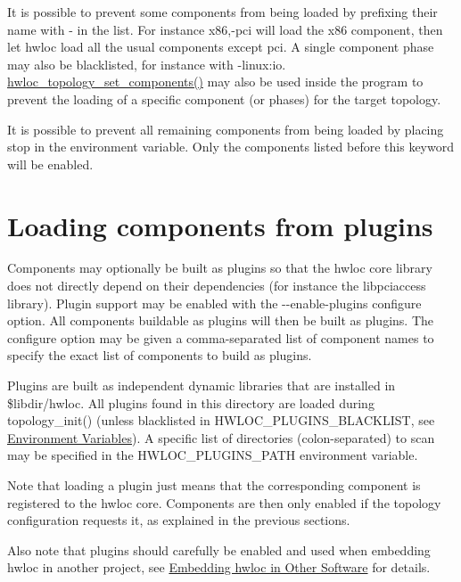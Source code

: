 It is possible to prevent some components from being loaded by prefixing their name with {\ttfamily -\/} in the list. For instance {\ttfamily x86,-\/pci} will load the {\ttfamily x86} component, then let hwloc load all the usual components except {\ttfamily pci}. A single component phase may also be blacklisted, for instance with {\ttfamily -\/linux\+:io}. \hyperlink{a00192_ga9ad41adf418cee1c0ee32ba9bd4a3d36}{hwloc\+\_\+topology\+\_\+set\+\_\+components()} may also be used inside the program to prevent the loading of a specific component (or phases) for the target topology.

It is possible to prevent all remaining components from being loaded by placing {\ttfamily stop} in the environment variable. Only the components listed before this keyword will be enabled.

 \hypertarget{a00392_plugins_load}{}\section{Loading components from plugins}\label{a00392_plugins_load}
Components may optionally be built as plugins so that the hwloc core library does not directly depend on their dependencies (for instance the {\ttfamily libpciaccess} library). Plugin support may be enabled with the {\ttfamily -\/-\/enable-\/plugins} configure option. All components buildable as plugins will then be built as plugins. The configure option may be given a comma-\/separated list of component names to specify the exact list of components to build as plugins.

Plugins are built as independent dynamic libraries that are installed in {\ttfamily \$libdir/hwloc}. All plugins found in this directory are loaded during {\ttfamily topology\+\_\+init()} (unless blacklisted in {\ttfamily H\+W\+L\+O\+C\+\_\+\+P\+L\+U\+G\+I\+N\+S\+\_\+\+B\+L\+A\+C\+K\+L\+I\+ST}, see \hyperlink{a00382}{Environment Variables}). A specific list of directories (colon-\/separated) to scan may be specified in the {\ttfamily H\+W\+L\+O\+C\+\_\+\+P\+L\+U\+G\+I\+N\+S\+\_\+\+P\+A\+TH} environment variable.

Note that loading a plugin just means that the corresponding component is registered to the hwloc core. Components are then only enabled if the topology configuration requests it, as explained in the previous sections.

Also note that plugins should carefully be enabled and used when embedding hwloc in another project, see \hyperlink{a00393}{Embedding hwloc in Other Software} for details.

